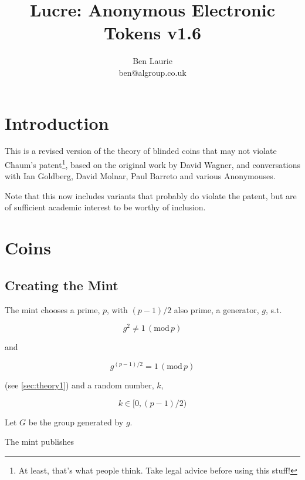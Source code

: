 \documentclass[a4paper,titlepage]{article}
\title{Lucre: Anonymous Electronic Tokens v1.6}
\author{Ben Laurie \\
ben@algroup.co.uk}
\begin{document}
\maketitle

\def\mod#1{\,(\textrm{mod}\,#1)}
\def\implies{\Rightarrow}
\def\qe#1{\begin{equation}#1\end{equation}}
\def\qearray#1{\begin{eqnarray}#1\end{eqnarray}}
\def\oneway#1{\textrm{oneway}(#1)}
\def\preoneway#1{\textrm{preoneway}(#1)}

\setlength{\parindent}{0pt}
\setlength{\parskip}{1ex plus 0.5ex minus 0.2ex}

\section{Introduction}

This is a revised version of the theory of blinded coins that may not
violate Chaum's patent\footnote{At least, that's what people
think. Take legal advice before using this stuff!}, based on the
original work by David Wagner, and conversations with Ian Goldberg,
David Molnar, Paul Barreto and various Anonymouses.

Note that this now includes variants that probably do violate the
patent, but are of sufficient academic interest to be worthy of
inclusion.

\section{Coins}

\subsection{Creating the Mint}
\label{sec:mint}

The mint chooses a prime, $p$, with $(p-1)/2$ also prime, a generator,
$g$, s.t.

\qe{\label{eq:3}g^2 \neq 1 \mod p}

and

\qe{\label{eq:1}g^{(p-1)/2} = 1 \mod p}

(see \ref{sec:theory1}) and a random number, $k$,

\qe{k \in [0,(p-1)/2)}

Let $G$ be the group generated by $g$.

The mint publishes
\end{document}
